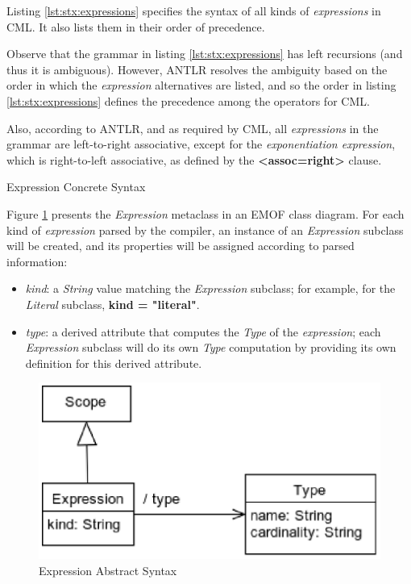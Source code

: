 Listing \ref{lst:stx:expressions} specifies the syntax of all kinds of \emph{expressions} in CML.
It also lists them in their order of precedence.

Observe that the grammar in listing \ref{lst:stx:expressions} has left recursions
(and thus it is ambiguous).
However, ANTLR \cite{antlr} resolves the ambiguity
based on the order in which the \emph{expression} alternatives are listed,
and so the order in listing \ref{lst:stx:expressions} defines the precedence among the operators for CML.

Also, according to ANTLR,
and as required by CML,
all \emph{expressions} in the grammar are left-to-right associative,
except for the \emph{exponentiation expression},
which is right-to-left associative,
as defined by the \textbf{<assoc=right>} clause.

\begin{code}
\verbatimfont{\small}

\caption{Expression Concrete Syntax}
\label{lst:stx:expressions}
\end{code}

Figure \ref{fig:meta:expression} presents the \emph{Expression} metaclass
in an EMOF \cite{mof} class diagram.
For each kind of \emph{expression} parsed by the compiler,
an instance of an \emph{Expression} subclass will be created,
and its properties will be assigned
according to parsed information:

\begin{itemize}

\item \emph{kind}:
a \emph{String} value matching the \emph{Expression} subclass;
for example, for the \emph{Literal} subclass, \textbf{kind = "literal"}.

\item \emph{type}:
a derived attribute that computes the \emph{Type} of the \emph{expression};
each \emph{Expression} subclass will do its own \emph{Type} computation
by providing its own definition for this derived attribute.

\end{itemize}

\begin{figure}
\includegraphics[width=\textwidth]{metamodel/expression}
\caption{Expression Abstract Syntax}
\label{fig:meta:expression}
\end{figure}
